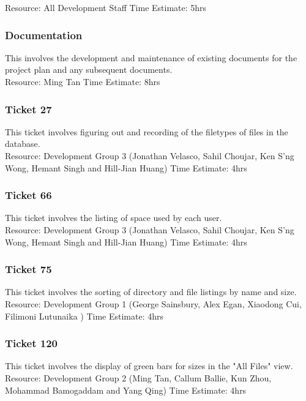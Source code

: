 \documentclass{article}
\begin{document}
	Resource: All Development Staff
	Time Estimate: 5hrs

\subsubsection{Documentation}
	This involves the development and maintenance of existing documents for the project plan and any subsequent documents.\\
	
	Resource: Ming Tan
	Time Estimate: 8hrs

\subsubsection{Ticket 27}
	This ticket involves figuring out and recording of the filetypes of files in the database.\\
	
	Resource: Development Group 3 (Jonathan Velasco, Sahil Choujar, Ken S'ng Wong, Hemant Singh and Hill-Jian Huang)
	Time Estimate: 4hrs

\subsubsection{Ticket 66}
	This ticket involves the listing of space used by each user.\\
	
	Resource: Development Group 3 (Jonathan Velasco, Sahil Choujar, Ken S'ng Wong, Hemant Singh and Hill-Jian Huang)
	Time Estimate: 4hrs

\subsubsection{Ticket 75}
	This ticket involves the sorting of directory and file listings by name and size.\\
	
	Resource: Development Group 1 (George Sainsbury, Alex Egan, Xiaodong Cui, Filimoni Lutunaika )
	Time Estimate: 4hrs

\subsubsection{Ticket 120}
	This ticket involves the display of green bars for sizes in the "All Files" view.\\

	Resource: Development Group 2 (Ming Tan, Callum Ballie, Kun Zhou, Mohammad Bamogaddam and Yang Qing)
	Time Estimate: 4hrs
	
\end{document}
